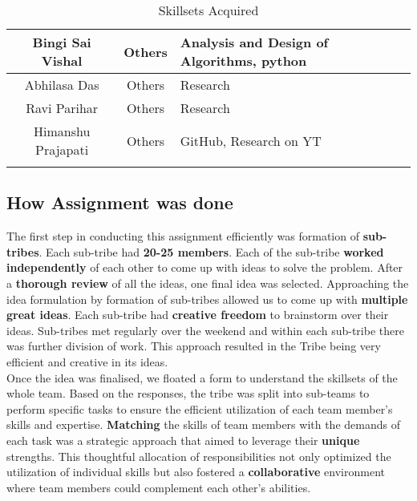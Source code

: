 \begin{center}
\begin{longtable}{ | c | c | m{6cm} | }
        \hline
        Bingi Sai Vishal           & Others            & Analysis and Design of Algorithms, python                               \\
        \hline
        Abhilasa Das               & Others            & Research                                                                \\
        \hline
        Ravi Parihar               & Others            & Research                                                                \\
        \hline
        Himanshu Prajapati         & Others            & GitHub, Research on YT                                                  \\
        \hline


        \hline
        \caption{Skillsets Acquired}
    \end{longtable}
\end{center}

\subsection{How Assignment was done}


The first step in conducting this assignment efficiently was formation of \textbf{sub-tribes}. Each sub-tribe had \textbf{20-25 members}. Each of the sub-tribe \textbf{worked independently} of each other to come up with ideas to solve the problem. After a \textbf{thorough review} of all the ideas, one final idea was selected. Approaching the idea formulation by formation of sub-tribes allowed us to come up with \textbf{multiple great ideas}. Each sub-tribe had \textbf{creative freedom} to brainstorm over their ideas. Sub-tribes met regularly over the weekend and within each sub-tribe there was further division of work. This approach resulted in the Tribe being very efficient and creative in its ideas.
\\

Once the idea was finalised, we floated a form to understand the skillsets of the whole team. Based on the responses, the tribe was split into sub-teams to perform specific tasks to ensure the efficient utilization of each team member's skills and expertise. \textbf{Matching} the skills of team members with the demands of each task was a strategic approach that aimed to leverage their \textbf{unique} strengths. This thoughtful allocation of responsibilities not only optimized the utilization of individual skills but also fostered a \textbf{collaborative} environment where team members could complement each other's abilities.
\\

